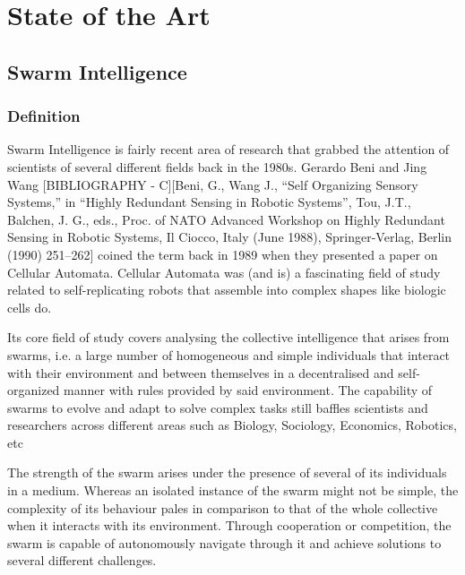 
\chapter{State of the Art}
\label{estadoarte}

\section{Swarm Intelligence}
\subsection{Definition}
Swarm Intelligence is fairly recent area of research that grabbed the attention of scientists of several different fields back in the 1980s. Gerardo Beni and Jing Wang [BIBLIOGRAPHY - C][Beni, G., Wang J., “Self Organizing Sensory Systems,” in “Highly Redundant Sensing in Robotic Systems”, Tou, J.T., Balchen, J. G., eds., Proc. of NATO Advanced Workshop on Highly Redundant Sensing in Robotic Systems, Il Ciocco, Italy (June 1988), Springer-Verlag, Berlin (1990) 251–262] coined the term back in 1989 when they presented a paper on Cellular Automata. Cellular Automata was (and is) a fascinating field of study related to self-replicating robots that assemble into complex shapes like biologic cells do.
	
Its core field of study covers analysing the collective intelligence that arises from swarms, i.e. a large number of homogeneous and simple individuals that interact with their environment and between themselves in a decentralised and self-organized manner with rules provided by said environment. The capability of swarms to evolve and adapt to solve complex tasks still baffles scientists and researchers across different areas such as Biology, Sociology, Economics, Robotics, etc \udots [BIBLIOGRAPHY - A]

The strength of the swarm arises under the presence of several of its individuals in a medium. Whereas an isolated instance of the swarm might not be simple, the complexity of its behaviour pales in comparison to that of the whole collective when it interacts with its environment. Through cooperation or competition, the swarm is capable of autonomously navigate through it and achieve solutions to several different challenges.

